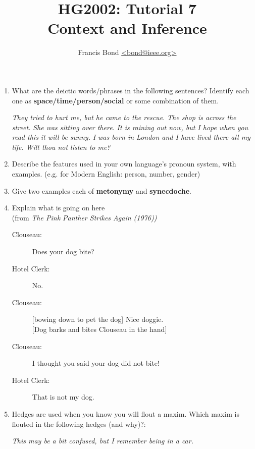 \documentclass[a4paper]{article}
\title{\vspace*{-30mm}HG2002: Tutorial 7\\  Context and Inference}
\author{Francis Bond \url{<bond@ieee.org>}}
\date{}%
\begin{document}
\maketitle

\begin{enumerate}

\item What are the deictic words/phrases in the following sentences?
  Identify each one as \textbf{space/time/person/social} or 
  some combination of them.

  \begin{exe}
    \ex \textit{They tried to hurt me, but he came to the rescue.}
    \ex \textit{The shop is across the street.}
    \ex \textit{She was sitting over there.}
    \ex \textit{It is raining out now, but I hope when you read this it will be sunny.}
    \ex \textit{I was born in London and I have lived there all my life.}
    \ex \textit{Wilt thou not listen to me?}
  \end{exe}
\item Describe the features used in your own language's pronoun system, with examples.
  (e.g. for Modern English: person, number, gender)

\item Give two examples each of \textbf{metonymy} and \textbf{synecdoche}.
\item Explain what is going on here 
  \\ (from \textit{The Pink Panther Strikes Again (1976))}
  \begin{description}
    \item[Clouseau:] Does your dog bite?
    \item[Hotel Clerk:] No.
    \item[Clouseau:] [bowing down to pet the dog] Nice doggie.
      \\ {}[Dog barks and bites Clouseau in the hand]
    \item[Clouseau:] I thought you said your dog did not bite!
    \item[Hotel Clerk:] That is not my dog. 
    \end{description}
  

\item Hedges are used when you know you will flout a maxim.  Which
  maxim is flouted in the following hedges (and why)?:

\begin{exe}
\ex \textit{This may be a bit confused, but I remember being in a car.}


\end{exe}
\end{enumerate}
\end{document}

